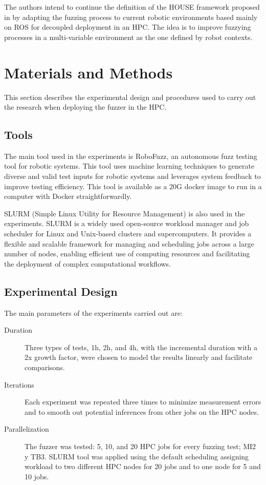 \documentclass{svproc}
\begin{document}
The authors intend to continue the definition of the HOUSE framework proposed in \cite{garnelo202139} by adapting the fuzzing process to current robotic environments based mainly on ROS for decoupled deployment in an HPC. The idea is to improve fuzzying processes in a multi-variable environment as the one defined by robot contexts. 

\section{Materials and Methods}
\label{sec:materials}

 This section describes the experimental design and procedures used to carry out the research when deploying the fuzzer in the HPC. 
 
\subsection{Tools}

The main tool used in the experiments is RoboFuzz\cite{Seulbae:2022}, an autonomous fuzz testing tool for robotic systems.  This tool uses machine learning techniques to generate diverse and valid test inputs for robotic systems and leverages system feedback to improve testing efficiency. This tool is available as a 20G docker image to run in a computer with Docker straightforwardly. 


SLURM (Simple Linux Utility for Resource Management) is also used in the experiments. SLURM is a widely used open-source workload manager and job scheduler for Linux and Unix-based clusters and supercomputers. It provides a flexible and scalable framework for managing and scheduling jobs across a large number of nodes, enabling efficient use of computing resources and facilitating the deployment of complex computational workflows.


\subsection{Experimental Design}

The main parameters of the experiments carried out are:
\begin{description}
    \item [Duration]
 Three types of tests,  1h, 2h, and 4h, with the incremental duration with a 2x growth factor, were chosen to model the results linearly and facilitate comparisons.
    \item [Iterations]
Each experiment was repeated three times to minimize measurement errors and to smooth out potential inferences from other jobs on the HPC nodes.    
    \item [Parallelization]
    The fuzzer was tested: 5, 10, and 20 HPC jobs for every fuzzing test; MI2 y TB3. SLURM tool was applied using the default scheduling assigning workload to two different HPC nodes for 20 jobs and to one node for 5 and 10 jobs.
    
\end{description}
\end{document}
